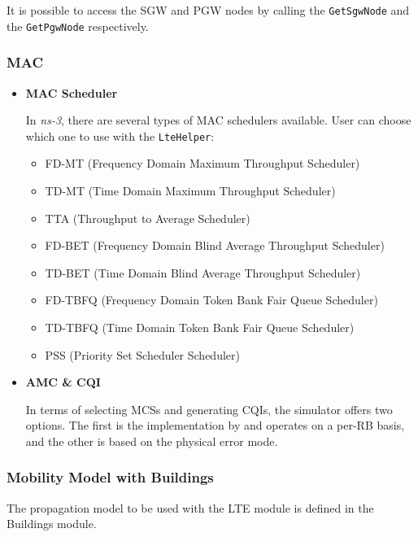 It is possible to access the SGW and PGW nodes by calling the \texttt{GetSgwNode} and the 
\texttt{GetPgwNode} respectively.

\subsubsection{MAC}
\begin{itemize}
  \item \textbf{MAC Scheduler}
  
  In \textit{ns-3}, there are several types of MAC schedulers available. User can choose which 
  one to use with the \texttt{LteHelper}:

  \begin{itemize}[noitemsep, topsep=0pt]
    \item FD-MT (Frequency Domain Maximum Throughput Scheduler) 
    \item TD-MT (Time Domain Maximum Throughput Scheduler) 
    \item TTA (Throughput to Average Scheduler) 
    \item FD-BET (Frequency Domain Blind Average Throughput Scheduler) 
    \item TD-BET (Time Domain Blind Average Throughput Scheduler) 
    \item FD-TBFQ (Frequency Domain Token Bank Fair Queue Scheduler) 
    \item TD-TBFQ (Time Domain Token Bank Fair Queue Scheduler) 
    \item PSS (Priority Set Scheduler Scheduler) 
  \end{itemize}



  \item \textbf{AMC \& CQI}
  
  In terms of selecting MCSs and generating CQIs, the simulator offers two options. 
  The first is the implementation by \cite{piro} and operates on a per-RB basis, and the other 
  is based on the physical error mode.

\end{itemize}


\subsubsection{Mobility Model with Buildings}
The propagation model to be used with the LTE module is defined in the
Buildings module.

